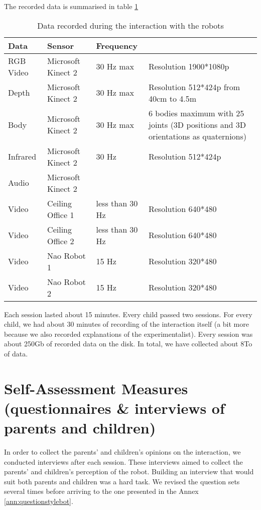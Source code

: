 \documentclass[smallextended]{svjour3}
\begin{document}
The recorded data is summarised in table \ref{tab:dataset}
\begin{table}[h]
	\centering
	\caption{Data recorded during the interaction with the robots}
	\begin{tabular}{l l p{2cm} p{3.5cm}}
		\hline
		Data  & Sensor & Frequency & \\ \hline
		RGB Video & Microsoft Kinect 2 & 30 Hz max & Resolution 1900*1080p \\
		Depth & Microsoft Kinect 2 & 30 Hz max & Resolution 512*424p from 40cm to 4.5m \\
		Body & Microsoft Kinect 2 & 30 Hz max & 6 bodies maximum with 25 joints (3D positions and 3D orientations as quaternions)\\
		Infrared & Microsoft Kinect 2 & 30 Hz & Resolution 512*424p \\ 
		Audio & Microsoft Kinect 2 &  &  \\
		\hline
		Video & Ceiling Office 1 & less than 30 Hz & Resolution 640*480 \\
		Video & Ceiling Office 2 & less than 30 Hz & Resolution 640*480 \\
		\hline
		Video & Nao Robot 1 & 15 Hz & Resolution 320*480 \\
		Video & Nao Robot 2 & 15 Hz & Resolution 320*480 \\
		\hline
	\end{tabular}
	\label{tab:dataset}
\end{table}


Each session lasted about 15 minutes. 
Every child passed two sessions. 
For every child, we had about 30 minutes of recording of the interaction itself (a bit more because we also recorded explanations of the experimentalist). 
Every session was about 250Gb of recorded data on the disk. 
In total, we have collected about 8To of data. 






\section{Self-Assessment Measures (questionnaires \& interviews of parents and children)}
In order to collect the parents' and children's opinions on the interaction, we conducted interviews after each session.
These interviews aimed to collect the parents' and children's perception of the robot.
Building an interview that would suit both parents and children was a hard task. 
We revised the question sets several times before arriving to the one presented in the Annex \ref{ann:questionstylebot}.
\end{document}
